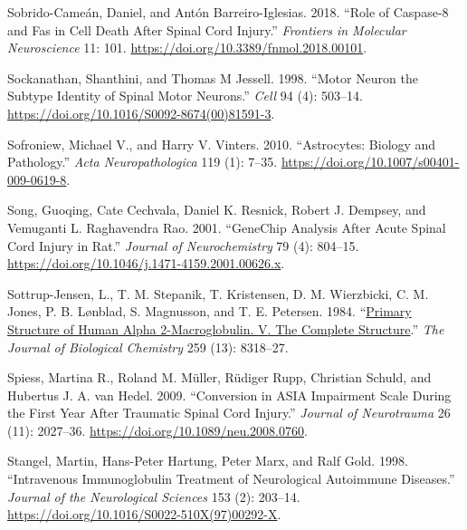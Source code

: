 \documentclass[9pt,lineno]{elife}
\newlength{\cslhangindent}
\newlength{\cslentryspacingunit} %
\newenvironment{CSLReferences}[2] %
 {%
  \setlength{\parindent}{0pt}
  \ifodd #1
  \let\oldpar\par
  \def\par{\hangindent=\cslhangindent\oldpar}
  \fi
  \setlength{\parskip}{#2\cslentryspacingunit}
 }%
 {}
\begin{document}
\begin{CSLReferences}{1}{0}
\leavevmode{}%
Sobrido-Cameán, Daniel, and Antón Barreiro-Iglesias. 2018. {``Role of {Caspase-8} and {Fas} in {Cell Death After Spinal Cord Injury}.''} \emph{Frontiers in Molecular Neuroscience} 11: 101. \url{https://doi.org/10.3389/fnmol.2018.00101}.

\leavevmode{}%
Sockanathan, Shanthini, and Thomas M Jessell. 1998. {``Motor {Neuron} the {Subtype Identity} of {Spinal Motor Neurons}.''} \emph{Cell} 94 (4): 503--14. \url{https://doi.org/10.1016/S0092-8674(00)81591-3}.

\leavevmode{}%
Sofroniew, Michael V., and Harry V. Vinters. 2010. {``Astrocytes: Biology and Pathology.''} \emph{Acta Neuropathologica} 119 (1): 7--35. \url{https://doi.org/10.1007/s00401-009-0619-8}.

\leavevmode{}%
Song, Guoqing, Cate Cechvala, Daniel K. Resnick, Robert J. Dempsey, and Vemuganti L. Raghavendra Rao. 2001. {``{GeneChip} Analysis After Acute Spinal Cord Injury in Rat.''} \emph{Journal of Neurochemistry} 79 (4): 804--15. \url{https://doi.org/10.1046/j.1471-4159.2001.00626.x}.

\leavevmode{}%
Sottrup-Jensen, L., T. M. Stepanik, T. Kristensen, D. M. Wierzbicki, C. M. Jones, P. B. Lønblad, S. Magnusson, and T. E. Petersen. 1984. {``\href{https://www.ncbi.nlm.nih.gov/pubmed/6203908}{Primary Structure of Human Alpha 2-Macroglobulin. {V}. {The} Complete Structure}.''} \emph{The Journal of Biological Chemistry} 259 (13): 8318--27.

\leavevmode{}%
Spiess, Martina R., Roland M. Müller, Rüdiger Rupp, Christian Schuld, and Hubertus J. A. van Hedel. 2009. {``Conversion in {ASIA Impairment Scale} During the First Year After Traumatic Spinal Cord Injury.''} \emph{Journal of Neurotrauma} 26 (11): 2027--36. \url{https://doi.org/10.1089/neu.2008.0760}.

\leavevmode{}%
Stangel, Martin, Hans-Peter Hartung, Peter Marx, and Ralf Gold. 1998. {``Intravenous Immunoglobulin Treatment of Neurological Autoimmune Diseases.''} \emph{Journal of the Neurological Sciences} 153 (2): 203--14. \url{https://doi.org/10.1016/S0022-510X(97)00292-X}.


\end{CSLReferences}
\end{document}
